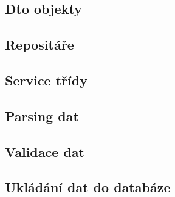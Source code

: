 \subsection{Dto objekty}
\subsection{Repositáře}
\subsection{Service třídy}
\subsection{Parsing dat}
\subsection{Validace dat}
\subsection{Ukládání dat do databáze}